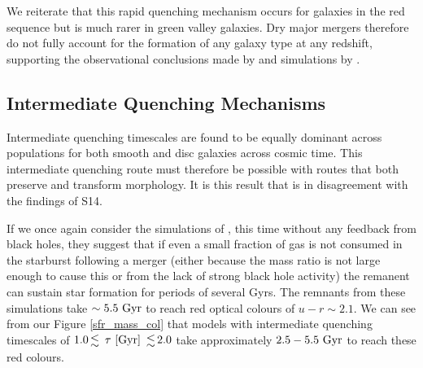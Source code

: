 \documentclass[useAMS,usenatbib]{mn2e}
\def\changed    {\color{titlecol} }
\begin{document}


{\changed We reiterate that this rapid quenching mechanism occurs for galaxies in the red sequence but is much rarer in green valley galaxies.} Dry major mergers therefore do not fully account for the formation of any galaxy type at any redshift, supporting the observational conclusions made by \citet{Bell07,Bundy07, Kav14} and simulations by \citet{Genel08}.

\subsection{Intermediate Quenching Mechanisms}\label{int}
{\changed Intermediate quenching timescales are found to be equally dominant across populations for both smooth and disc galaxies across cosmic time.} This intermediate quenching route must therefore be possible with routes that both preserve and transform morphology. It is this result that is in disagreement with the findings of S14. 

If we once again consider the simulations of \citet{Springel05}, this time without any feedback from black holes, they suggest that if even a small fraction of gas is not consumed in the starburst following a merger (either because the mass ratio is not large enough to cause this or from the lack of strong black hole activity) the remanent can sustain star formation for periods of several Gyrs. The remnants from these simulations take $\sim5.5~\rm{Gyr}$ to reach red optical colours of $u-r \sim 2.1$. We can see from our Figure \ref{sfr_mass_col} that models with intermediate quenching timescales of $1.0 \la ~\tau~\rm{[Gyr]} ~\la 2.0$ take approximately $2.5-5.5~\rm{Gyr}$ to reach these red colours.
\end{document}
